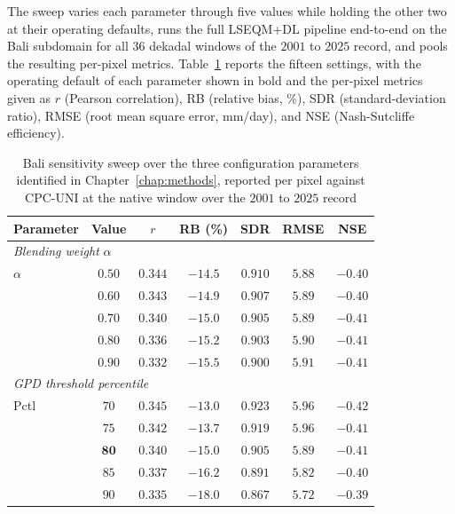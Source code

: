 The sweep varies each parameter through five values while
holding the other two at their operating defaults, runs the full
LSEQM+DL pipeline end-to-end on the Bali subdomain for all $36$
dekadal windows of the $2001$ to $2025$ record, and pools the
resulting per-pixel metrics.
Table~\ref{tab:sensitivity-bali} reports the fifteen settings,
with the operating default of each parameter shown in bold and
the per-pixel metrics given as $r$ (Pearson correlation), RB
(relative bias, \%), SDR (standard-deviation ratio), RMSE (root
mean square error, mm/day), and NSE (Nash-Sutcliffe efficiency).

\begin{table}[H]
\centering
\caption[Bali sensitivity sweep over the three configuration parameters]{Bali sensitivity sweep over the three configuration
parameters identified in Chapter~\ref{chap:methods}, reported per pixel against CPC-UNI at the native window over the $2001$ to $2025$ record\label{tab:sensitivity-bali}}
\begingroup\small
\begin{tabular*}{\textwidth}{@{\extracolsep{\fill}}lcccccc@{}}
\toprule
Parameter & Value & $r$ & RB (\%) & SDR & RMSE & NSE \\
\midrule
\multicolumn{7}{l}{\textit{Blending weight} $\alpha$} \\
$\alpha$ & $0.50$ & $0.344$ & $-14.5$ & $0.910$ & $5.88$ & $-0.40$ \\
         & $0.60$ & $0.343$ & $-14.9$ & $0.907$ & $5.89$ & $-0.40$ \\
         & $\mathbf{0.70}$ & $\mathbf{0.340}$ & $\mathbf{-15.0}$ & $\mathbf{0.905}$ & $\mathbf{5.89}$ & $\mathbf{-0.41}$ \\
         & $0.80$ & $0.336$ & $-15.2$ & $0.903$ & $5.90$ & $-0.41$ \\
         & $0.90$ & $0.332$ & $-15.5$ & $0.900$ & $5.91$ & $-0.41$ \\
\midrule
\multicolumn{7}{l}{\textit{GPD threshold percentile}} \\
Pctl     & $70$ & $0.345$ & $-13.0$ & $0.923$ & $5.96$ & $-0.42$ \\
         & $75$ & $0.342$ & $-13.7$ & $0.919$ & $5.96$ & $-0.41$ \\
         & $\mathbf{80}$ & $\mathbf{0.340}$ & $\mathbf{-15.0}$ & $\mathbf{0.905}$ & $\mathbf{5.89}$ & $\mathbf{-0.41}$ \\
         & $85$ & $0.337$ & $-16.2$ & $0.891$ & $5.82$ & $-0.40$ \\
         & $90$ & $0.335$ & $-18.0$ & $0.867$ & $5.72$ & $-0.39$ \\

\end{tabular*}
\end{table}
